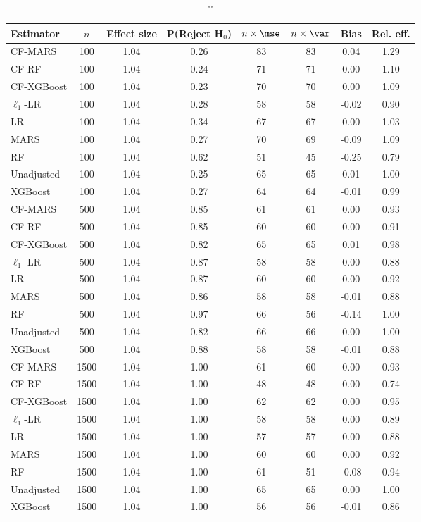 
\begin{table}
\centering
\caption{""}
\begin{tabular}{lccccccc}
\toprule
Estimator & $n$ & Effect size & P(Reject H$_0$) & $n\times\mse$ & $n\times \var$ & Bias & Rel. eff.\\ \midrule
CF-MARS & 100 & 1.04 & 0.26 & 83 & 83 &  0.04 & 1.29 \\ 
CF-RF & 100 & 1.04 & 0.24 & 71 & 71 &  0.00 & 1.10 \\ 
CF-XGBoost & 100 & 1.04 & 0.23 & 70 & 70 &  0.00 & 1.09 \\ 
$\ell_1$-LR & 100 & 1.04 & 0.28 & 58 & 58 & -0.02 & 0.90 \\ 
LR & 100 & 1.04 & 0.34 & 67 & 67 &  0.00 & 1.03 \\ 
MARS & 100 & 1.04 & 0.27 & 70 & 69 & -0.09 & 1.09 \\ 
RF & 100 & 1.04 & 0.62 & 51 & 45 & -0.25 & 0.79 \\ 
Unadjusted & 100 & 1.04 & 0.25 & 65 & 65 &  0.01 & 1.00 \\ 
XGBoost & 100 & 1.04 & 0.27 & 64 & 64 & -0.01 & 0.99 \\ \addlinespace 
CF-MARS & 500 & 1.04 & 0.85 & 61 & 61 &  0.00 & 0.93 \\ 
CF-RF & 500 & 1.04 & 0.85 & 60 & 60 &  0.00 & 0.91 \\ 
CF-XGBoost & 500 & 1.04 & 0.82 & 65 & 65 &  0.01 & 0.98 \\ 
$\ell_1$-LR & 500 & 1.04 & 0.87 & 58 & 58 &  0.00 & 0.88 \\ 
LR & 500 & 1.04 & 0.87 & 60 & 60 &  0.00 & 0.92 \\ 
MARS & 500 & 1.04 & 0.86 & 58 & 58 & -0.01 & 0.88 \\ 
RF & 500 & 1.04 & 0.97 & 66 & 56 & -0.14 & 1.00 \\ 
Unadjusted & 500 & 1.04 & 0.82 & 66 & 66 &  0.00 & 1.00 \\ 
XGBoost & 500 & 1.04 & 0.88 & 58 & 58 & -0.01 & 0.88 \\ \addlinespace 
CF-MARS & 1500 & 1.04 & 1.00 & 61 & 60 &  0.00 & 0.93 \\ 
CF-RF & 1500 & 1.04 & 1.00 & 48 & 48 &  0.00 & 0.74 \\ 
CF-XGBoost & 1500 & 1.04 & 1.00 & 62 & 62 &  0.00 & 0.95 \\ 
$\ell_1$-LR & 1500 & 1.04 & 1.00 & 58 & 58 &  0.00 & 0.89 \\ 
LR & 1500 & 1.04 & 1.00 & 57 & 57 &  0.00 & 0.88 \\ 
MARS & 1500 & 1.04 & 1.00 & 60 & 60 &  0.00 & 0.92 \\ 
RF & 1500 & 1.04 & 1.00 & 61 & 51 & -0.08 & 0.94 \\ 
Unadjusted & 1500 & 1.04 & 1.00 & 65 & 65 &  0.00 & 1.00 \\ 
XGBoost & 1500 & 1.04 & 1.00 & 56 & 56 & -0.01 & 0.86 \\
\bottomrule
\end{tabular}
\end{table}

